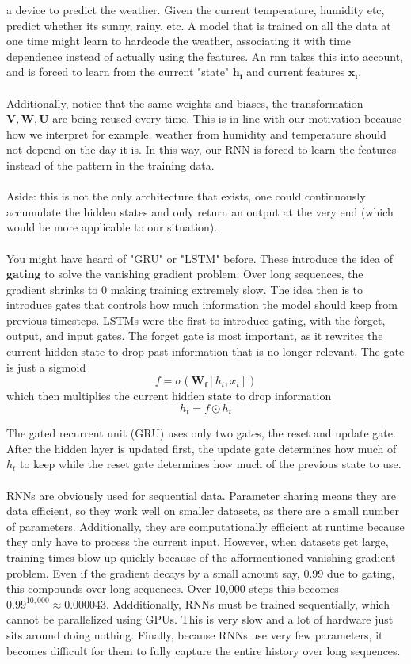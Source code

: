 \documentclass[11pt]{article}
\begin{document}
a device to predict the weather. Given the current temperature, humidity etc, predict whether its sunny, rainy, etc. A model that is trained on all the data at one time might learn to hardcode the weather, associating it
with time dependence instead of actually using the features. An rnn takes this into account, and is forced to learn from the current "state" \(\mathbf{h_i}\) and current features \(\mathbf{x_i}\). 
\\
\\
Additionally, notice that the same weights and biases, the transformation \(\mathbf{V}, \mathbf{W}, \mathbf{U}\) are being reused every time. This is in line with our motivation because how we interpret
for example, weather from humidity and temperature should not depend on the day it is. In this way, our RNN is forced to learn the features instead of the pattern in the training data.
\\
\\
Aside: this is not the only architecture that exists, one could continuously accumulate the hidden states and only return an output at the very end (which would be more applicable to our situation).
\\
\\
\noindent You might have heard of "GRU" or "LSTM" before. These introduce the idea of \textbf{gating} to solve the vanishing gradient problem. Over long sequences, the gradient shrinks to 0 making training
extremely slow. The idea then is to introduce gates that controls how much information the model should keep from previous timesteps. LSTMs were the first to introduce gating, with the forget, output, and input gates. 
The forget gate is most important, as it rewrites the current hidden state to drop past information that is no longer relevant. The gate is just a sigmoid
\[
    f = \sigma(\mathbf{W_f}[h_t, x_t])
\]
which then multiplies the current hidden state to drop information
\[
    h_t = f \odot h_t
\]

\noindent The gated recurrent unit (GRU) uses only two gates, the reset and update gate. After the hidden layer is updated first, the update gate determines how much of \(h_t\) to keep while the reset gate determines
how much of the previous state to use.
\\
\\
\noindent RNNs are obviously used for sequential data. Parameter sharing means they are data efficient, so they work well on smaller datasets, as there are a small number of parameters. Additionally, they are computationally 
efficient at runtime because they only have to process the current input. However, when datasets get large, training times blow up quickly because of the afformentioned
vanishing gradient problem. Even if the gradient decays by a small amount say, 0.99 due to gating, this compounds over long sequences. Over 10,000 steps this becomes \(0.99^{10,000} \approx 0.000043\). Addditionally, RNNs must be trained
sequentially, which cannot be parallelized using GPUs. This is very slow and a lot of hardware just sits around doing nothing. Finally, because RNNs use very few parameters, it becomes difficult for them to fully capture the entire history over
long sequences.
\end{document}
